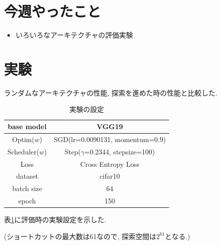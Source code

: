 \documentclass[twocolumn]{jarticle}     %
\begin{document}


\section{今週やったこと}
\begin{itemize}
  \item いろいろなアーキテクチャの評価実験
\end{itemize}

\section{実験}

ランダムなアーキテクチャの性能,
探索を進めた時の性能と比較した.

\begin{table}[tb]
  \begin{center}
    \caption{実験の設定}
    \begin{tabular}{|c|c|} \hline
      base model & VGG19 \\ \hline
      Optim($w$) & SGD(lr=0.0090131, momentum=0.9) \\ \hline
      Scheduler($w$) & Step($\gamma$=0.2344, stepsize=100) \\ \hline
      Loss & Cross Entropy Loss \\ \hline
      dataset & cifar10 \\ \hline
      batch size & 64 \\ \hline
      epoch & 150 \\ \hline
    \end{tabular}
    \label{tab:setting}
  \end{center}
\end{table}

表\ref{tab:setting}に評価時の実験設定を示した.

(ショートカットの最大数は61なので, 探索空間は$2^{61}$となる.)
\end{document}
